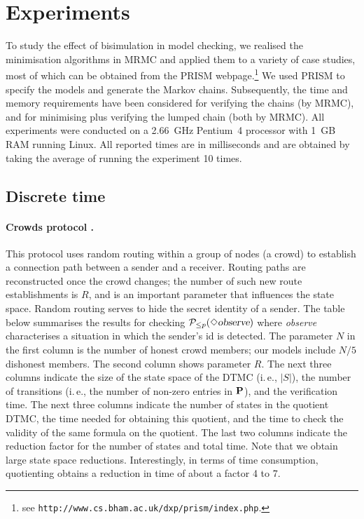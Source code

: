 \documentclass{llncs}
\begin{document}
\section{Experiments}
\label{sec:exper}

To study the effect of bisimulation in model checking,
we realised the minimisation algorithms in MRMC
and applied them to a variety of case studies, most of which  
can be obtained from the PRISM webpage.\footnote{see {\tt http://www.cs.bham.ac.uk/dxp/prism/index.php}.}
We used PRISM to specify the models and generate the Markov chains.
Subsequently, the time and memory requirements have been considered for verifying
the chains (by MRMC), and for minimising plus verifying the lumped chain (both by 
MRMC). 
All experiments were conducted on a 2.66~GHz Pentium~4 processor with 1~GB RAM running 
Linux.
All reported times are in milliseconds and are obtained by taking the average of running 
the experiment 10 times.

\subsection{Discrete time}

\paragraph{Crowds protocol \cite{ReiterR_ACMTISS98}.}
This protocol uses random routing within a group of nodes (a crowd) to establish a 
connection path between a sender and a receiver.  
Routing paths are reconstructed once the crowd changes; the number of such new route
establishments is $R$, and is an important parameter that
influences the state space.
Random routing serves to hide the secret identity of a sender.
The table below summarises the results for checking ${\cal P}_{\leq p}(\Diamond \mbox{\sl 
observe})$ where {\sl observe} characterises a situation in which the sender's id is
detected.
The parameter $N$ in the first column is the number of honest crowd members;
our models include $N/5$ dishonest members.
The second column shows parameter $R$.
The next three columns indicate the size of the state space of the DTMC (i.\,e., $|S|$),
the number of transitions (i.\,e., the number of non-zero entries in $\mathbf{P}$), and the 
verification time.
The next three columns indicate the number of states in the quotient DTMC, the time needed
for obtaining this quotient, and the time to check the validity of the same formula on
the quotient.
The last two columns indicate the reduction factor for the number of states and total time.
Note that we obtain large state space reductions.  
Interestingly, in terms of time consumption, quotienting obtains a reduction in time of
about a factor 4 to 7.
\end{document}
